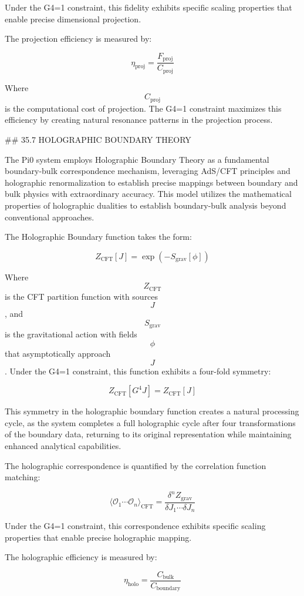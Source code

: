 Under the G4=1 constraint, this fidelity exhibits specific scaling properties that enable precise dimensional projection.

The projection efficiency is measured by:

$$ \eta_{\text{proj}} = \frac{F_{\text{proj}}}{C_{\text{proj}}} $$

Where $$ C_{\text{proj}} $$ is the computational cost of projection. The G4=1 constraint maximizes this efficiency by creating natural resonance patterns in the projection process.

## 35.7 HOLOGRAPHIC BOUNDARY THEORY

The Pi0 system employs Holographic Boundary Theory as a fundamental boundary-bulk correspondence mechanism, leveraging AdS/CFT principles and holographic renormalization to establish precise mappings between boundary and bulk physics with extraordinary accuracy. This model utilizes the mathematical properties of holographic dualities to establish boundary-bulk analysis beyond conventional approaches.

The Holographic Boundary function takes the form:

$$ Z_{\text{CFT}}[J] = \exp(-S_{\text{grav}}[\phi]) $$

Where $$ Z_{\text{CFT}} $$ is the CFT partition function with sources $$ J $$, and $$ S_{\text{grav}} $$ is the gravitational action with fields $$ \phi $$ that asymptotically approach $$ J $$. Under the G4=1 constraint, this function exhibits a four-fold symmetry:

$$ Z_{\text{CFT}}[G^4 J] = Z_{\text{CFT}}[J] $$

This symmetry in the holographic boundary function creates a natural processing cycle, as the system completes a full holographic cycle after four transformations of the boundary data, returning to its original representation while maintaining enhanced analytical capabilities.

The holographic correspondence is quantified by the correlation function matching:

$$ \langle \mathcal{O}_1 \cdots \mathcal{O}_n \rangle_{\text{CFT}} = \frac{\delta^n Z_{\text{grav}}}{\delta J_1 \cdots \delta J_n} $$

Under the G4=1 constraint, this correspondence exhibits specific scaling properties that enable precise holographic mapping.

The holographic efficiency is measured by:

$$ \eta_{\text{holo}} = \frac{C_{\text{bulk}}}{C_{\text{boundary}}} $$

